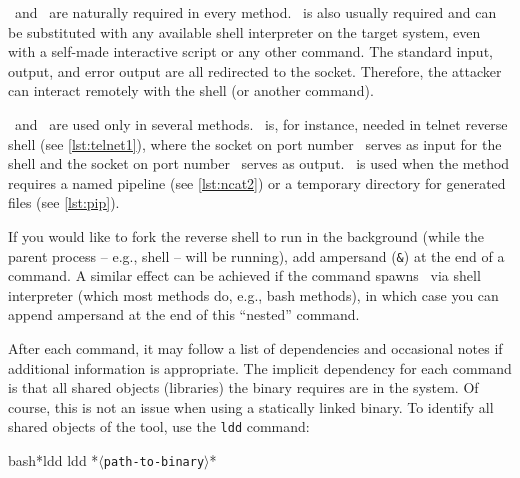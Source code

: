 \host\ and \port\ are naturally required in every method. \shell\ is also usually required and can be substituted with any available shell interpreter on the target system, even with a self-made interactive script or any other command. The standard input, output, and error output are all redirected to the socket. Therefore, the attacker can interact remotely with the shell (or another command).

\portt\ and \tmp\ are used only in several methods. \portt\ is, for instance, needed in telnet reverse shell (see \cref{lst:telnet1}), where the socket on port number \port\ serves as input for the shell and the socket on port number \portt\ serves as output. \tmp\ is used when the method requires a named pipeline (see \cref{lst:ncat2}) or a temporary directory for generated files (see \cref{lst:pip}).

If you would like to fork the reverse shell to run in the background (while the parent process -- e.g., shell -- will be running), add ampersand (\texttt{\&}) at the end of a command. A similar effect can be achieved if the command spawns \shell\ via shell interpreter (which most methods do, e.g., bash methods), in which case you can append ampersand at the end of this ``nested'' command.

After each command, it may follow a list of dependencies and occasional notes if additional information is appropriate. The implicit dependency for each command is that all shared objects (libraries) the binary requires are in the system. Of course, this is not an issue when using a statically linked binary. To identify all shared objects of the tool, use the \texttt{ldd} command:
\begin{cmdline}{bash}{*}{ldd}{}
ldd *\textcolor{placeholder}{\texttt{$\langle$path-to-binary$\rangle$}}*
\end{cmdline}
